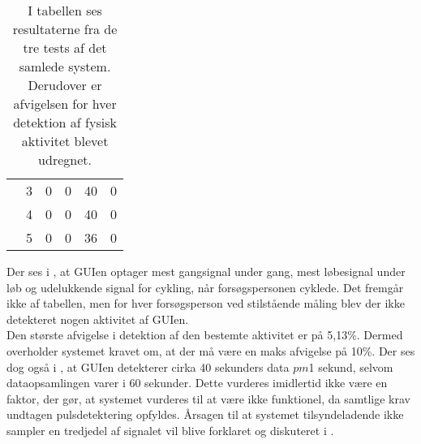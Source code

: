 \begin{table}[H]
\begin{tabular}{cccccc}
		& 3             & 0                                                                                                  & 0                                                                                                & 40      & 0                                                                                              \\
		& 4             & 0                                                                                                  & 0                                                                                                & 40    & 0                                                                                                 \\
		& 5             & 0                                                                                                  & 0                                                                                                & 36 & 0   \\ \hline                                                                                                
		\end{tabular}
		\caption{I tabellen ses resultaterne fra de tre tests af det samlede system. Derudover er afvigelsen for hver detektion af fysisk aktivitet blevet udregnet.}
		\label{tab:samlet_sys_test1}
\end{table}
Der ses i , at GUIen optager mest gangsignal under gang, mest løbesignal under løb og udelukkende signal for cykling, når forsøgspersonen cyklede. Det fremgår ikke af tabellen, men for hver forsøgsperson ved stilstående måling blev der ikke detekteret nogen aktivitet af GUIen. \\
Den største afvigelse i detektion af den bestemte aktivitet er på 5,13\%. Dermed overholder systemet kravet om, at der må være en maks afvigelse på 10\%. Der ses dog også i , at GUIen detekterer cirka 40 sekunders data $pm$1 sekund, selvom dataopsamlingen varer i 60 sekunder. Dette vurderes imidlertid ikke være en faktor, der gør, at systemet vurderes til at være ikke funktionel, da samtlige krav undtagen pulsdetektering opfyldes. Årsagen til at systemet tilsyndeladende ikke sampler en tredjedel af signalet vil blive forklaret og diskuteret i .

